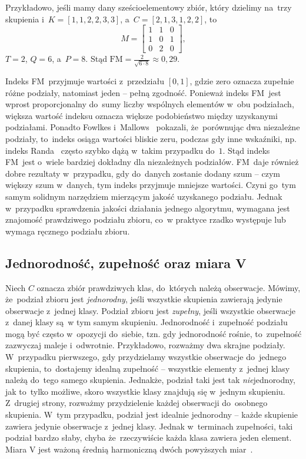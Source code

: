 \documentclass{praca1}
\begin{document}
Przykładowo, jeśli mamy dany sześcioelementowy zbiór, który dzielimy na~trzy skupienia i~$K = [1, 1, 2, 2, 3, 3]$, a~$C = [2, 1, 3, 1, 2, 2]$, to~
$$
M = \begin{bmatrix}
      1 & 1 & 0 \\
      1 & 0 & 1 \\
      0 & 2 & 0
     \end{bmatrix},
$$
$T = 2$, $Q = 6$, a~$P = 8$. Stąd $\mathrm{FM} = \frac{2}{\sqrt{6\cdot 8}} \approx 0,29$.

Indeks FM~przyjmuje wartości z~przedziału $[0,1]$, gdzie zero oznacza zupełnie różne podziały, natomiast jeden -- pełną zgodność. Ponieważ indeks FM~jest wprost proporcjonalny do~sumy liczby wspólnych elementów w~obu podziałach, większa wartość indeksu oznacza większe podobieństwo między uzyskanymi podziałami. Ponadto Fowlkes i~Mallows~\cite{Fowlkes1983:fmindex} pokazali, że~porównując dwa niezależne podziały, to~indeks osiąga wartości bliskie zeru, podczas gdy inne wskaźniki, np. indeks Randa~\cite{Rand1971:objective} często szybko dążą w~takim przypadku do~$1$. Stąd indeks FM~jest o~wiele bardziej dokładny dla niezależnych podziałów. FM~daje również dobre rezultaty w~przypadku, gdy do~danych zostanie dodany szum -- czym większy szum w~danych, tym indeks przyjmuje mniejsze wartości. Czyni go~tym samym solidnym narzędziem mierzącym jakość uzyskanego podziału. 
Jednak w~przypadku sprawdzenia jakości działania jednego algorytmu, wymagana jest znajomość prawdziwego podziału zbioru, co~w praktyce rzadko występuje lub wymaga ręcznego podziału zbioru.


\subsection{Jednorodność, zupełność oraz miara V}

Niech $C$ oznacza zbiór prawdziwych klas, do~których należą obserwacje. Mówimy, że~podział zbioru jest \emph{jednorodny}, jeśli wszystkie skupienia zawierają jedynie obserwacje z~jednej klasy. Podział zbioru jest \emph{zupełny}, jeśli wszystkie obserwacje z~danej klasy są~w tym samym skupieniu. Jednorodność i~zupełność podziału mogą być często w~opozycji do~siebie, tzn. gdy jednorodność rośnie, to~zupełność zazwyczaj maleje i~odwrotnie. Przykładowo, rozważmy dwa skrajne podziały. W~przypadku pierwszego, gdy przydzielamy wszystkie obserwacje do~jednego skupienia, to~dostajemy idealną zupełność -- wszystkie elementy z~jednej klasy należą do~tego samego skupienia. Jednakże, podział taki jest tak \emph{nie}jednorodny, jak to~tylko możliwe, skoro wszystkie klasy znajdują się w~jednym skupieniu. Z~drugiej strony, rozważmy przydzielenie każdej obserwacji do~osobnego skupienia. W~tym przypadku, podział jest idealnie jednorodny -- każde skupienie zawiera jedynie obserwacje z~jednej klasy. Jednak w~terminach zupełności, taki podział bardzo słaby, chyba że~rzeczywiście każda klasa zawiera jeden element. Miara $\textrm{V}$ jest ważoną średnią harmoniczną dwóch powyższych miar~\cite{Rosenberg2007:vmeasure}.
\end{document}
